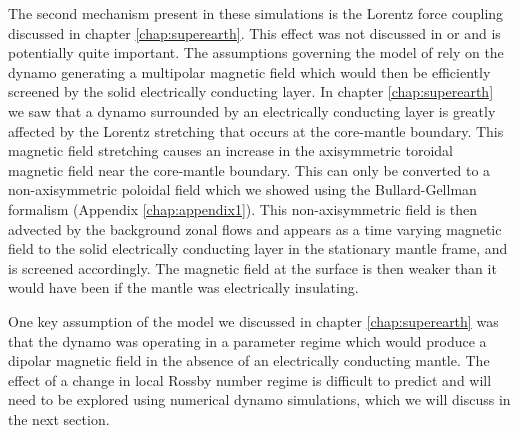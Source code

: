 The second mechanism present in these simulations is the Lorentz force coupling discussed in chapter \ref{chap:superearth}. This effect was not discussed in \citet{smith2012} or \citet{hauck2013} and is potentially quite important.  The assumptions governing the model of \citet{smith2012} rely on the dynamo generating a multipolar magnetic field which would then be efficiently screened by the solid electrically conducting layer. In chapter \ref{chap:superearth} we saw that a dynamo surrounded by an electrically conducting layer is greatly affected by the Lorentz stretching that occurs at the core-mantle boundary. This magnetic field stretching causes an increase in the axisymmetric toroidal magnetic field near the core-mantle boundary. This can only be converted to a non-axisymmetric poloidal field which we showed using the Bullard-Gellman formalism (Appendix \ref{chap:appendix1}). This non-axisymmetric field is then advected by the background zonal flows and appears as a time varying magnetic field to the solid electrically conducting layer in the stationary mantle frame, and is screened accordingly. The magnetic field at the surface is then weaker than it would have been if the mantle was electrically insulating.

One key assumption of the model we discussed in chapter \ref{chap:superearth} was that the dynamo was operating in a parameter regime which would produce a dipolar magnetic field in the absence of an electrically conducting mantle. The effect of a change in local Rossby number regime is difficult to predict and will need to be explored using numerical dynamo simulations, which we will discuss in the next section.

